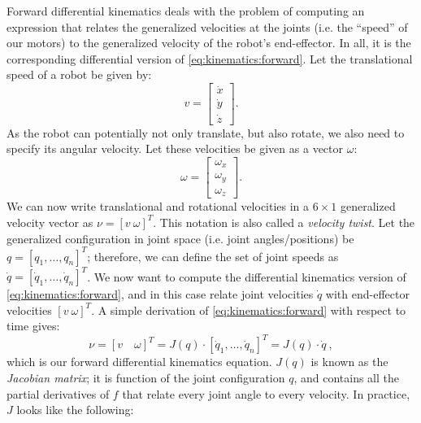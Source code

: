 Forward differential kinematics deals with the problem of computing an expression that relates the generalized velocities at the joints (i.e. the ``speed'' of our motors) to the generalized velocity of the robot's end-effector. In all, it is the corresponding differential version of \cref{eq:kinematics:forward}.
Let the translational speed of a robot be given by:
\begin{equation}
v=\left[\begin{array}{c}
\dot{x}\\
\dot{y}\\
\dot{z}
\end{array}
\right].
\end{equation}
As the robot can potentially not only translate, but also rotate, we also need to specify its angular velocity. Let these velocities be given as a vector $\omega$:
\begin{equation}
\omega=\left[\begin{array}{c}
\omega_x\\
\omega_y\\
\omega_z
\end{array}
\right].
\end{equation}
We can now write translational and rotational velocities in a $6\times1$ generalized velocity vector as $\nu = [v \ \omega]^T$.
This notation is also called a \textsl{velocity twist}. %
Let the generalized configuration in joint space (i.e. joint angles/positions) be $q=[q_1, \ldots, q_n]^T$; therefore, we can define the set of joint speeds as $\dot{q}=[\dot{q}_1, \ldots, \dot{q}_n]^T$.
%
We now want to compute the differential kinematics version of \cref{eq:kinematics:forward}, and in this case relate joint velocities $\dot{q}$ with end-effector velocities $[v \ \omega]^T$. A simple derivation of \cref{eq:kinematics:forward} with respect to time gives:
\begin{equation}\label{eq:kinematics:diff:fwd:short}
\nu = [v \quad \omega]^T=J(q)\cdot [\dot{q}_1,\ldots,\dot{q}_n]^T = J(q) \cdot \dot{q} \ ,
\end{equation}
which is our forward differential kinematics equation. $J(q)$ is known as the \textsl{Jacobian matrix}; it is function of the joint configuration $q$, and contains all the partial derivatives of $f$ that relate every joint angle to every velocity. In practice, $J$ looks like the following:

